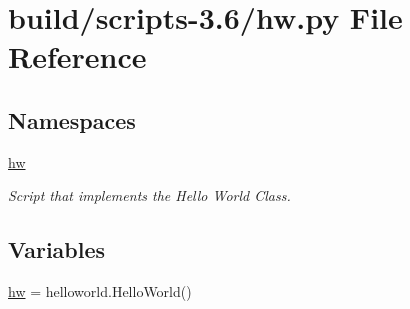 \hypertarget{build_2scripts-3_86_2hw_8py}{}\section{build/scripts-\/3.6/hw.py File Reference}
\label{build_2scripts-3_86_2hw_8py}
\subsection*{Namespaces}
\begin{DoxyCompactItemize}
\item 
 \hyperlink{namespacehw}{hw}
\begin{DoxyCompactList}\small\item\em Script that implements the Hello World Class. \end{DoxyCompactList}\end{DoxyCompactItemize}
\subsection*{Variables}
\begin{DoxyCompactItemize}
\item 
\hyperlink{namespacehw_ab67f5bd69fb707530c4fb25c3b71ac2c}{hw} = helloworld.\+Hello\+World()
\end{DoxyCompactItemize}

